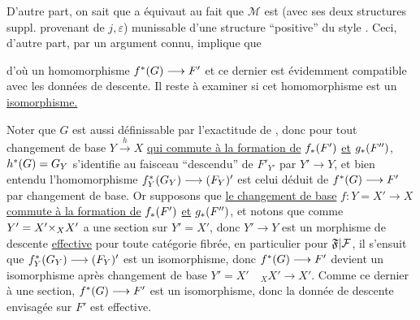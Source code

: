 
D'autre part, on sait que a équivaut au fait que $\mathcal M$ est (avec ses deux structures suppl. provenant de $j,\varepsilon$) munissable d'une structure ``positive'' du style . Ceci, d'autre part, par un argument connu, implique que



d'où un homomorphisme $f^{{*}}(G)\longrightarrow F'$ et ce dernier est évidemment compatible avec les données de descente. Il reste à examiner si cet homomorphisme est un \uline{isomorphisme.}


Noter que $G$ est aussi définissable par l'exactitude de
,
donc pour tout changement de base $Y\xrightarrow{h}X$ \uline{qui commute à la formation de} $f_{{*}}(F')$ \uline{et} $g_{{*}}(F'')$, $h^{{*}}(G)=G_Y$ s'identifie au faisceau ``descendu'' de $F'_{Y'}$ par $Y'\longrightarrow Y$, et bien entendu l'homomorphisme $f_Y^{{*}}(G_Y)\longrightarrow(F_Y)'$ est celui déduit de $f^{{*}}(G)\longrightarrow F'$ par changement de base. Or supposons que \uline{le changement de base} $f:Y=X'\longrightarrow X$ \uline{commute à la formation de} $f_{{*}}(F')$ \uline{et} $g_{{*}}(F'')$, et notons que comme $Y'=X'{\times}_X X'$ a une section sur $Y'=X'$, donc $Y'\longrightarrow Y$ est un morphisme de descente \uline{effective} pour toute catégorie fibrée, en particulier pour ${\mathfrak F|\mathcal F}$, il s'ensuit que $f_Y^{{*}}(G_Y)\longrightarrow(F_Y)'$ est un isomorphisme, donc $f^{{*}}(G)\longrightarrow F'$ devient un isomorphisme après changement de base $Y'=X'\quad{}_X X'\longrightarrow X'$. Comme ce dernier à une section, $f^{{*}}(G)\longrightarrow F'$ est un isomorphisme, donc la donnée de descente envisagée sur $F'$ est effective.

